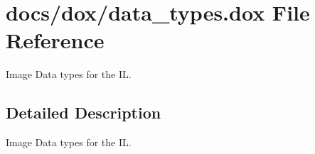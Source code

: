 \hypertarget{data__types_8dox}{\section{docs/dox/data\+\_\+types.dox File Reference}
\label{data__types_8dox}
}


Image Data types for the I\+L.  




\subsection{Detailed Description}
Image Data types for the I\+L. 

